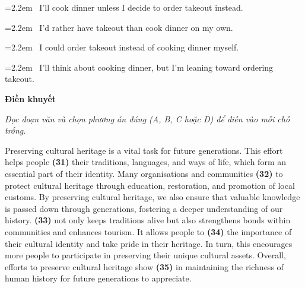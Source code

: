 \documentclass[12pt,a4paper,twoside]{article}
\newcommand{\choiceitem}[2]{%
    \tikz[baseline=-0.5ex]{%
        \node[draw=primaryBlue, circle, minimum size=1.5em, inner sep=0pt, thick] {\textbf{#1}};%
    }~#2%
}
\newenvironment{readingpassage}[1][]{%
    \begin{tcolorbox}[enhanced, colback=grayLight, colframe=secondaryBlue,
        coltitle=textDark, fonttitle=\bfseries, title={#1},
        rounded corners, arc=3mm, boxrule=1pt,
        left=15pt, right=15pt, top=10pt, bottom=10pt,
        breakable, before skip=10pt, after skip=10pt, drop fuzzy shadow]
    \setstretch{1.3}
}{\end{tcolorbox}}
\begin{document}
\par\vspace{4pt}
\noindent\hangindent=2.2em\choiceitem{A}{I’ll cook dinner unless I decide to order takeout instead.}\par\vspace{4pt}
\noindent\hangindent=2.2em\choiceitem{B}{I'd rather have takeout than cook dinner on my own.}\par\vspace{4pt}
\noindent\hangindent=2.2em\choiceitem{C}{I could order takeout instead of cooking dinner myself.}\par\vspace{4pt}
\noindent\hangindent=2.2em\choiceitem{D}{I’ll think about cooking dinner, but I’m leaning toward ordering takeout.}\par\vspace{4pt}

\begin{groupbox}\textbf{\large Điền khuyết}\end{groupbox}
\textit{Đọc đoạn văn và chọn phương án đúng (A, B, C hoặc D) để điền vào mỗi chỗ trống.}
\begin{readingpassage}[]
Preserving cultural heritage is a vital task for future generations. This effort helps people \textbf{(31)} \underline{\hspace{1.3cm}} their traditions, languages, and ways of life, which form an essential part of their identity. Many organisations and communities \textbf{(32)} \underline{\hspace{1.3cm}} to protect cultural heritage through education, restoration, and promotion of local customs. By preserving cultural heritage, we also ensure that valuable knowledge is passed down through generations, fostering a deeper understanding of our history. \textbf{(33)} \underline{\hspace{1.3cm}} not only keeps traditions alive but also strengthens bonds within communities and enhances tourism. It allows people to \textbf{(34)} \underline{\hspace{1.3cm}} the importance of their cultural identity and take pride in their heritage. In turn, this encourages more people to participate in preserving their unique cultural assets. Overall, efforts to preserve cultural heritage show \textbf{(35)} \underline{\hspace{1.3cm}} in maintaining the richness of human history for future generations to appreciate.
\end{readingpassage}
\end{document}
